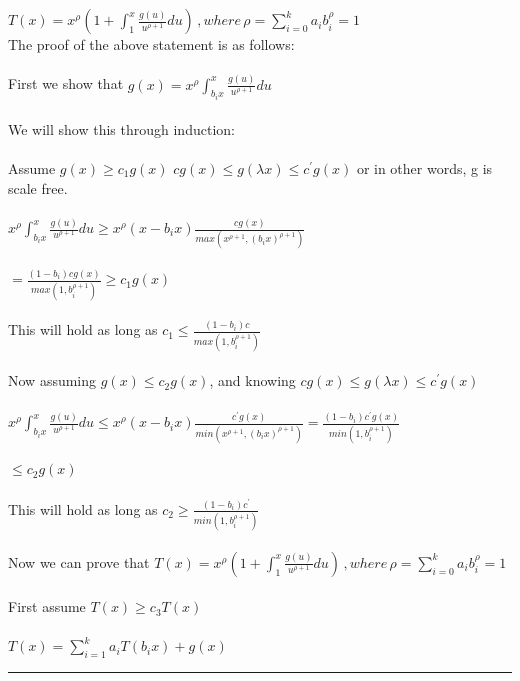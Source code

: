 \documentclass[tikz]{article}
\newcommand{\shortbar}{\begin{center}\rule{5ex}{0.1pt}\end{center}}
\theoremstyle{plain}
\theoremstyle{definition}
\theoremstyle{remark}
\newenvironment{solution}[1]{\medskip\noindent{\bf Problem #1.~}}{\shortbar}
\begin{document}
\begin{solution}{2}\\\\

$T(x) = x^{\rho}(1 + \int_{1}^{x} \frac{g(u)}{u^{\rho + 1}}du) \, ,where \, \rho = \sum_{i=0}^{k} a_ib_i^{\rho} = 1$\\
The proof of the above statement is as follows:\\
\\
First we show that $g(x) = x^{\rho}\int_{b_ix}^{x} \frac{g(u)}{u^{\rho + 1}}du$\\\\
We will show this through induction:\\
\\
Assume $g(x) \geq c_1g(x)\,\,cg(x) \leq g(\lambda x) \leq c^{'}g(x)$ or in other words, g is scale free.\\
\\
$x^{\rho}\int_{b_ix}^{x} \frac{g(u)}{u^{\rho + 1}}du \geq x^{\rho}(x-b_i x) \frac{cg(x)}{max(x^{\rho + 1}, (b_i x)^{\rho + 1})}$\\
\\
$=\frac{(1-b_i)cg(x)}{max(1,b_i^{\rho + 1})} \geq c_1g(x)$\\
\\
This will hold as long as $c_1 \leq \frac{(1-b_i)c}{max(1,b_i^{\rho + 1})}$\\
\\
Now assuming $g(x) \leq c_2g(x)$, and knowing $cg(x) \leq g(\lambda x) \leq c^{'}g(x)$\\
\\
$x^{\rho}\int_{b_ix}^{x} \frac{g(u)}{u^{\rho + 1}}du \leq x^{\rho}(x-b_i x) \frac{c^{'}g(x)}{min(x^{\rho + 1}, (b_i x)^{\rho + 1})}
=\frac{(1-b_i)c^{'}g(x)}{min(1,b_i^{\rho + 1})}$\\
\\
$\leq c_2g(x)$\\
\\
This will hold as long as $c_2 \geq \frac{(1-b_i)c^{'}}{min(1,b_i^{\rho + 1})}$\\
\\
Now we can prove that $T(x) = x^{\rho}(1 + \int_{1}^{x} \frac{g(u)}{u^{\rho + 1}}du) \, ,where \, \rho = \sum_{i=0}^{k} a_ib_i^{\rho} = 1$\\
\\
First assume $T(x) \geq c_3T(x)$\\
\\
$T(x) = \sum_{i=1}^{k} a_i T(b_i x) + g(x)$\\

\end{solution}
\end{document}
